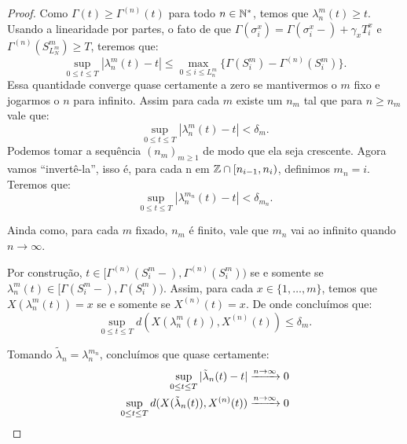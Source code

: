 \begin{proof}
  Como $\Gamma(t) \geq \Gamma^{(n)}(t)$ para todo $n \in {\mathbb{N^*}}$, temos
  que $\lambda_n^m(t) \geq t$. Usando a linearidade por partes, o fato
  de que $\Gamma(\sigma^x_i) = \Gamma(\sigma_i^x-) + \gamma_x T^x_i$ e
  $\Gamma^{(n)}(S^m_{L_N^m}) \geq T$, teremos que:
  \begin{displaymath}
    \sup_{0 \leq t \leq T} |\lambda_n^m(t) - t| \leq
    \max_{0 \leq i \leq L_n^m} \{ \Gamma(S_i^m) -
    \Gamma^{(n)}(S_i^m)\}.
  \end{displaymath}
  Essa quantidade converge quase certamente a zero se mantivermos o
  $m$ fixo e jogarmos o $n$ para infinito. Assim para cada $m$ existe
  um $n_m$ tal que para $n \geq n_m$ vale que:
  \begin{displaymath}
    \sup_{0 \leq t \leq T} |\lambda_n^m(t) - t| < \delta_m.
  \end{displaymath}
  Podemos tomar a sequência $(n_m)_{m \geq 1}$ de modo que ela seja
  crescente. Agora vamos ``invertê-la'', isso é, para cada n em ${\mathbb{Z}}
  \cap [n_{i-1}, n_i)$, definimos $m_n = i$. Teremos que:
  \begin{displaymath}
    \sup_{0 \leq t \leq T} |\lambda_n^{m_n}(t) - t| < \delta_{m_n}.
  \end{displaymath}

  Ainda como, para cada $m$ fixado, $n_m$ é finito, vale que $m_n$ vai
  ao infinito quando $n \to \infty$.
  
  Por construção, $t \in [\Gamma^{(n)}(S_{i}^m-),
  \Gamma^{(n)}(S_{i}^m))$ se e somente se $\lambda_n^m(t) \in
  [\Gamma(S_{i}^m-), \Gamma(S_{i}^m))$. Assim, para cada $x \in \{1,
  \ldots, m\}$, temos que $X(\lambda_n^m(t)) = x$ se e somente se
  $X^{(n)}(t) = x$. De onde concluímos que:
  \begin{displaymath}
    \sup_{0 \leq t \leq T} d\left(X(\lambda_n^m(t)), X^{(n)} (t)\right)
    \leq \delta_m.
  \end{displaymath}

  Tomando $\tilde{\lambda}_n = \lambda_n^{m_n}$, concluímos que quase
  certamente:
  \begin{align*}
    \sup_{0 \leq t \leq T} |\tilde{\lambda}_n(t) - t|
    &\xrightarrow{n\to\infty} 0 \\
    \sup_{0 \leq t \leq T} d(X(\tilde{\lambda}_n(t)), X^{(n)}(t))
    &\xrightarrow{n\to\infty} 0
    \qedhere
  \end{align*}
\end{proof}

